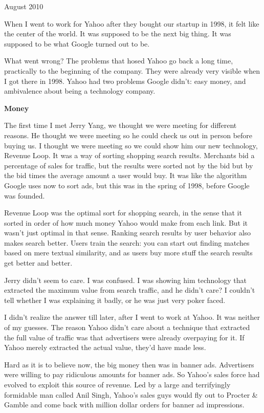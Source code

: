 August 2010

When I went to work for Yahoo after they bought our startup in 1998, it
felt like the center of the world. It was supposed to be the next big
thing. It was supposed to be what Google turned out to be.

What went wrong? The problems that hosed Yahoo go back a long time,
practically to the beginning of the company. They were already very
visible when I got there in 1998. Yahoo had two problems Google didn't:
easy money, and ambivalence about being a technology company.

\textbf{Money}

The first time I met Jerry Yang, we thought we were meeting for
different reasons. He thought we were meeting so he could check us out
in person before buying us. I thought we were meeting so we could show
him our new technology, Revenue Loop. It was a way of sorting shopping
search results. Merchants bid a percentage of sales for traffic, but the
results were sorted not by the bid but by the bid times the average
amount a user would buy. It was like the algorithm Google uses now to
sort ads, but this was in the spring of 1998, before Google was founded.

Revenue Loop was the optimal sort for shopping search, in the sense that
it sorted in order of how much money Yahoo would make from each link.
But it wasn't just optimal in that sense. Ranking search results by user
behavior also makes search better. Users train the search: you can start
out finding matches based on mere textual similarity, and as users buy
more stuff the search results get better and better.

Jerry didn't seem to care. I was confused. I was showing him technology
that extracted the maximum value from search traffic, and he didn't
care? I couldn't tell whether I was explaining it badly, or he was just
very poker faced.

I didn't realize the answer till later, after I went to work at Yahoo.
It was neither of my guesses. The reason Yahoo didn't care about a
technique that extracted the full value of traffic was that advertisers
were already overpaying for it. If Yahoo merely extracted the actual
value, they'd have made less.

Hard as it is to believe now, the big money then was in banner ads.
Advertisers were willing to pay ridiculous amounts for banner ads. So
Yahoo's sales force had evolved to exploit this source of revenue. Led
by a large and terrifyingly formidable man called Anil Singh, Yahoo's
sales guys would fly out to Procter \& Gamble and come back with million
dollar orders for banner ad impressions.

